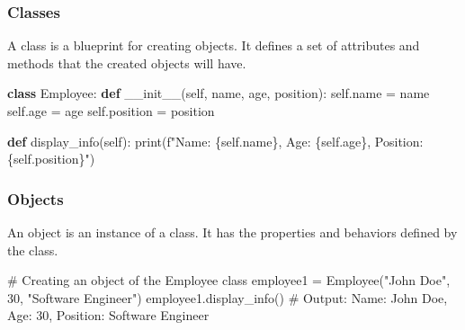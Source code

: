 \documentclass[
  letterpaper,
  DIV=11,
  numbers=noendperiod]{scrreprt}
\newenvironment{Shaded}{\begin{snugshade}}{\end{snugshade}}
\newcommand{\BuiltInTok}[1]{\textcolor[rgb]{0.00,0.23,0.31}{#1}}
\newcommand{\CommentTok}[1]{\textcolor[rgb]{0.37,0.37,0.37}{#1}}
\newcommand{\DecValTok}[1]{\textcolor[rgb]{0.68,0.00,0.00}{#1}}
\newcommand{\FunctionTok}[1]{\textcolor[rgb]{0.28,0.35,0.67}{#1}}
\newcommand{\KeywordTok}[1]{\textcolor[rgb]{0.00,0.23,0.31}{\textbf{#1}}}
\newcommand{\NormalTok}[1]{\textcolor[rgb]{0.00,0.23,0.31}{#1}}
\newcommand{\OperatorTok}[1]{\textcolor[rgb]{0.37,0.37,0.37}{#1}}
\newcommand{\SpecialCharTok}[1]{\textcolor[rgb]{0.37,0.37,0.37}{#1}}
\newcommand{\SpecialStringTok}[1]{\textcolor[rgb]{0.13,0.47,0.30}{#1}}
\newcommand{\StringTok}[1]{\textcolor[rgb]{0.13,0.47,0.30}{#1}}
\newcommand{\VariableTok}[1]{\textcolor[rgb]{0.07,0.07,0.07}{#1}}
\begin{document}
\subsubsection{Classes}\label{classes}

A class is a blueprint for creating objects. It defines a set of
attributes and methods that the created objects will have.

\begin{Shaded}
\begin{Highlighting}[]
\KeywordTok{class}\NormalTok{ Employee:}
    \KeywordTok{def} \FunctionTok{\_\_init\_\_}\NormalTok{(}\VariableTok{self}\NormalTok{, name, age, position):}
        \VariableTok{self}\NormalTok{.name }\OperatorTok{=}\NormalTok{ name}
        \VariableTok{self}\NormalTok{.age }\OperatorTok{=}\NormalTok{ age}
        \VariableTok{self}\NormalTok{.position }\OperatorTok{=}\NormalTok{ position}
    
    \KeywordTok{def}\NormalTok{ display\_info(}\VariableTok{self}\NormalTok{):}
        \BuiltInTok{print}\NormalTok{(}\SpecialStringTok{f"Name: }\SpecialCharTok{\{}\VariableTok{self}\SpecialCharTok{.}\NormalTok{name}\SpecialCharTok{\}}\SpecialStringTok{, Age: }\SpecialCharTok{\{}\VariableTok{self}\SpecialCharTok{.}\NormalTok{age}\SpecialCharTok{\}}\SpecialStringTok{, Position: }\SpecialCharTok{\{}\VariableTok{self}\SpecialCharTok{.}\NormalTok{position}\SpecialCharTok{\}}\SpecialStringTok{"}\NormalTok{)}
\end{Highlighting}
\end{Shaded}

\subsubsection{Objects}\label{objects}

An object is an instance of a class. It has the properties and behaviors
defined by the class.

\begin{Shaded}
\begin{Highlighting}[]
\CommentTok{\# Creating an object of the Employee class}
\NormalTok{employee1 }\OperatorTok{=}\NormalTok{ Employee(}\StringTok{"John Doe"}\NormalTok{, }\DecValTok{30}\NormalTok{, }\StringTok{"Software Engineer"}\NormalTok{)}
\NormalTok{employee1.display\_info()  }\CommentTok{\# Output: Name: John Doe, Age: 30, Position: Software Engineer}
\end{Highlighting}
\end{Shaded}
\end{document}
